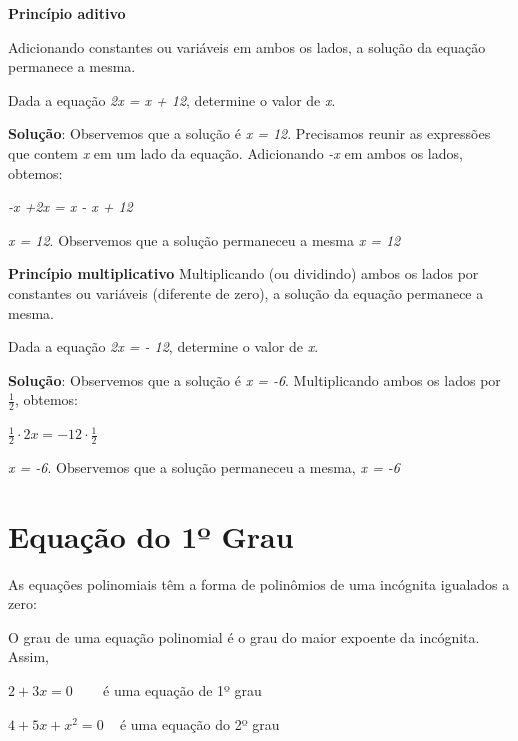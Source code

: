 \begin{caixa}
\textbf{Princípio aditivo}

Adicionando constantes ou variáveis em ambos os lados, a solução da equação permanece a mesma.
\end{caixa}

\begin{texemplo}
Dada a equação \textit{2x = x + 12}, determine o valor de \textit{x}.

\textbf{Solução}: Observemos que a solução é \textit{x = 12}. Precisamos reunir as expressões que contem \textit{x} em um lado da equação. Adicionando \textit{-x} em ambos os lados, obtemos:

\textit{-x +2x = x - x + 12}

\textit{x = 12}. Observemos que a solução permaneceu a mesma \textit{x = 12}~  \qedsymbol{}
\end{texemplo}

\begin{caixa}
\textbf{Princípio multiplicativo}
Multiplicando (ou dividindo) ambos os lados por constantes ou variáveis (diferente de zero), a solução da equação permanece a mesma.
\end{caixa}

\begin{texemplo}
Dada a equação \textit{2x = - 12}, determine o valor de \textit{x}.

\textbf{Solução}: Observemos que a solução é \textit{x = -6}. Multiplicando ambos os lados por $\frac{1}{2}$, obtemos:

 \( \frac{1}{2} \cdot 2x= -12  \cdot  \frac{1}{2} \)

\textit{x = -6}. Observemos que a solução permaneceu a mesma, \textit{x = -6} \qedsymbol{}
\end{texemplo}

\section{Equação do 1º Grau}

As equações polinomiais têm a forma de polinômios de uma incógnita igualados a zero:


O grau de uma equação polinomial é o grau do maior expoente da incógnita. Assim,\textbf{ }

 \( 2+3x=0 \) ~~~ é uma equação de 1º grau

 \( 4+5x+x^{2}=0 \) ~ é uma equação do 2º grau


